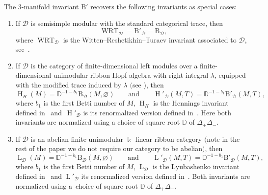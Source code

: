 \documentclass[pdftex]{sigma}
\numberwithin{equation}{section}
\numberwithin{theorem}{section}
\numberwithin{proposition}{section}
\numberwithin{definition}{section}
\numberwithin{lemma}{section}
\numberwithin{corollary}{section}
\numberwithin{remark}{section}
\numberwithin{example}{section}
\newcommand{\catd}{\mathcal{D}}
\newcommand{\FK}{{\Bbbk}}
\newcommand{\ThreeManInv}{\mathrm{B}}
\begin{document}
\begin{theorem} The $3$-manifold invariant $\ThreeManInv'$ recovers the following invariants as special cases:
 \begin{enumerate}\itemsep=0pt
 \item[$1.$] If $\catd$ is semisimple modular with the standard categorical trace, then
 \[\operatorname{WRT}_\catd=\ThreeManInv'_\catd=\ThreeManInv_\catd,\]
 where $\operatorname{WRT}_\catd$ is the Witten--Reshetikhin--Turaev
 invariant associated to $\catd$, see~{\rm \cite{RT, Tu}}.
 \item[$2.$] If $\catd$ is the category of finite-dimensional left
modules over a finite-dimensional unimodular ribbon Hopf algebra with right integral
$\lambda$, equipped with the modified trace induced by $\lambda$ $($see
{\rm\cite[{\it Theorem} 1]{BBG17b})}, then
\[
\operatorname{H}_H(M)=\mathbb{D}^{-1-b_1}\ThreeManInv_\catd(M,\varnothing) \qquad \text{and}\qquad \operatorname{H}'_\catd(M,T) =\mathbb{D}^{-1-b_1}\ThreeManInv'_\catd(M,T),
\]
where
$b_1$ is the first Betti number of $M$, $\operatorname{H}_H$ is the Hennings invariant defined in~{\rm \cite{H96}} and~$\operatorname{H}'_\catd$ is its renormalized version defined in~{\rm \cite{DRGPM18}}. Here both invariants are normalized using a choice of square root $\mathbb{D}$ of $\Delta_+\Delta_-$.
\item[$3.$] If $\catd$ is an abelian finite unimodular $\FK$-linear ribbon category $($note in the rest of the paper we do not require our category to be abelian$)$, then
\[\operatorname{L}_\catd(M)=\mathbb{D}^{-1-b_1}\ThreeManInv_\catd(M,\varnothing) \qquad\text{and}\qquad \operatorname{L}'_\catd(M,T) =\mathbb{D}^{-1-b_1}\ThreeManInv'_\catd(M,T),\]
where
$b_1$ is the first Betti number of $M$, $\operatorname{L}_\catd$ is the Lyubashenko invariant defined in~{\rm \cite{L94}} and $\operatorname{L}'_\catd$ its renormalized version defined in~{\rm \cite{DRGGPMR2022}}. Both invariants are normalized using a~choice of square root $\mathbb{D}$ of $\Delta_+\Delta_-$.
 \end{enumerate}
\end{theorem}
\end{document}
